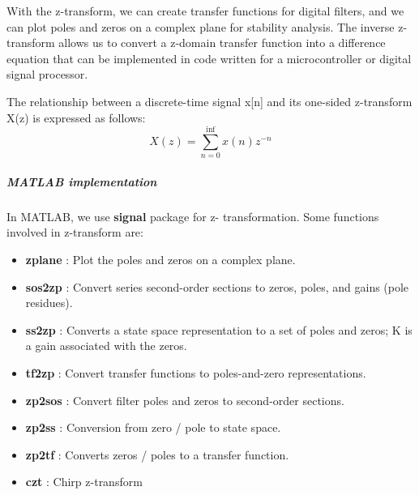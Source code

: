 \documentclass[12pt]{article}
\begin{document}
With the z-transform, we can create transfer functions for digital filters, 
and we can plot poles and zeros on a complex plane for stability analysis. 
The inverse z-transform allows us to convert a z-domain transfer function into a difference equation 
that can be implemented in code written for a microcontroller or digital signal processor.

The relationship between a discrete-time signal x[n] and its one-sided z-transform X(z) is expressed as follows:
\begin{equation}
        X(z) = \sum_{n=0}^{\inf} x(n)z^{-n}
\end{equation}
\subparagraph{MATLAB implementation\\}
In MATLAB, we use {\bfseries signal} package for z- transformation. 
Some functions involved in z-transform are: 
\begin{itemize}
    \item {\bfseries zplane} : Plot the poles and zeros on a complex plane.
    \item {\bfseries sos2zp} : Convert series second-order sections to zeros, poles, and gains (pole residues).
    \item {\bfseries ss2zp} : Converts a state space representation to a set of poles and zeros; K is a gain associated with the zeros.
    \item {\bfseries tf2zp} : Convert transfer functions to poles-and-zero representations.
    \item {\bfseries zp2sos} : Convert filter poles and zeros to second-order sections.
    \item {\bfseries zp2ss} : Conversion from zero / pole to state space.
    \item {\bfseries zp2tf} : Converts zeros / poles to a transfer function.
    \item {\bfseries czt} : Chirp z-transform
\end{itemize}
\pagebreak
\end{document}
